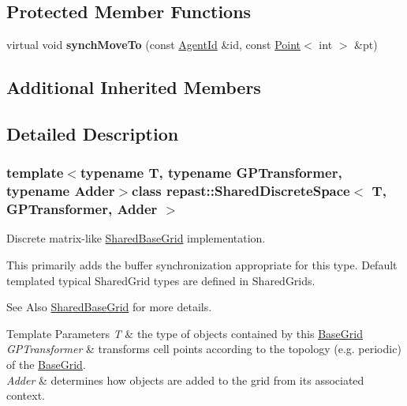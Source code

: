 \subsection*{Protected Member Functions}
\begin{DoxyCompactItemize}
\item 
\hypertarget{classrepast_1_1_shared_discrete_space_a76b6b3583d899b77eb1f78b46c268db2}{virtual void {\bfseries synch\-Move\-To} (const \hyperlink{classrepast_1_1_agent_id}{Agent\-Id} \&id, const \hyperlink{classrepast_1_1_point}{Point}$<$ int $>$ \&pt)}\label{classrepast_1_1_shared_discrete_space_a76b6b3583d899b77eb1f78b46c268db2}

\end{DoxyCompactItemize}
\subsection*{Additional Inherited Members}


\subsection{Detailed Description}
\subsubsection*{template$<$typename T, typename G\-P\-Transformer, typename Adder$>$class repast\-::\-Shared\-Discrete\-Space$<$ T, G\-P\-Transformer, Adder $>$}

Discrete matrix-\/like \hyperlink{classrepast_1_1_shared_base_grid}{Shared\-Base\-Grid} implementation. 

This primarily adds the buffer synchronization appropriate for this type. Default templated typical Shared\-Grid types are defined in Shared\-Grids.

\begin{DoxySeeAlso}{See Also}
\hyperlink{classrepast_1_1_shared_base_grid}{Shared\-Base\-Grid} for more details.
\end{DoxySeeAlso}

\begin{DoxyTemplParams}{Template Parameters}
{\em T} & the type of objects contained by this \hyperlink{classrepast_1_1_base_grid}{Base\-Grid} \\
\hline
{\em G\-P\-Transformer} & transforms cell points according to the topology (e.\-g. periodic) of the \hyperlink{classrepast_1_1_base_grid}{Base\-Grid}. \\
\hline
{\em Adder} & determines how objects are added to the grid from its associated context. \\
\hline
\end{DoxyTemplParams}


